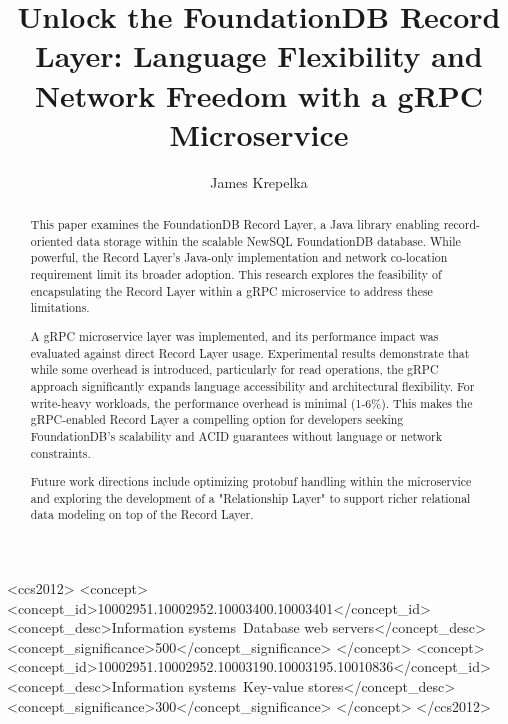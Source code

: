 \documentclass[sigconf]{acmart}
\begin{document}
\title[Unlock the FoundationDB Record Layer]{Unlock the FoundationDB Record Layer: Language Flexibility and Network Freedom with a gRPC Microservice}

\author{James Krepelka}

\begin{abstract}
    This paper examines the FoundationDB Record Layer, a Java library enabling record-oriented data storage within the scalable NewSQL FoundationDB database. While powerful, the Record Layer's Java-only implementation and network co-location requirement limit its broader adoption. This research explores the feasibility of encapsulating the Record Layer within a gRPC microservice to address these limitations.
    
    A gRPC microservice layer was implemented, and its performance impact was evaluated against direct Record Layer usage. Experimental results demonstrate that while some overhead is introduced, particularly for read operations, the gRPC approach significantly expands language accessibility and architectural flexibility. For write-heavy workloads, the performance overhead is minimal (1-6\%). This makes the gRPC-enabled Record Layer a compelling option for developers seeking FoundationDB's scalability and ACID guarantees without language or network constraints.
    
    Future work directions include optimizing protobuf handling within the microservice and exploring the development of a "Relationship Layer" to support richer relational data modeling on top of the Record Layer.
\end{abstract}

\begin{CCSXML}
<ccs2012>
   <concept>
       <concept_id>10002951.10002952.10003400.10003401</concept_id>
       <concept_desc>Information systems~Database web servers</concept_desc>
       <concept_significance>500</concept_significance>
       </concept>
   <concept>
       <concept_id>10002951.10002952.10003190.10003195.10010836</concept_id>
       <concept_desc>Information systems~Key-value stores</concept_desc>
       <concept_significance>300</concept_significance>
       </concept>
 </ccs2012>
\end{CCSXML}
\end{document}
